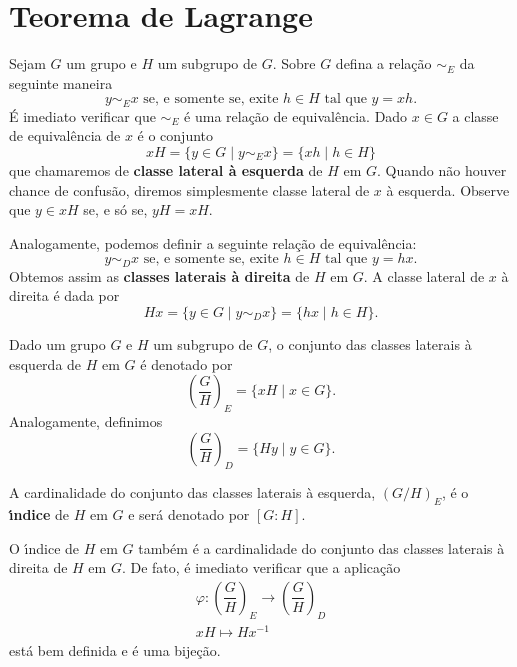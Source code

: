 
\section{Teorema de Lagrange} %
\label{sec:teorema_de_lagrange}

Sejam $G$ um grupo e $H$ um subgrupo de $G$. Sobre $G$ defina a rela\c{c}\~ao $\sim_{E}$ da seguinte maneira
\[
	y \sim_{E} x \mbox{ se, e somente se, exite } h \in H \mbox{ tal que } y = xh.
\]
\'E imediato verificar que $\sim_{E}$ \'e uma rela\c{c}\~ao de equival\^encia. Dado $x \in G$ a classe de equival\^encia de $x$ \'e o conjunto
\[
	xH = \{y \in G \mid y \sim_{E} x\} = \{xh \mid h \in H\}
\]
que chamaremos de \textbf{classe lateral \`a esquerda} de $H$ em $G$. Quando n\~ao houver chance de confus\~ao, diremos simplesmente classe lateral de $x$ \`a esquerda. Observe que $y \in xH$ se, e s\'o se, $yH = xH$.

Analogamente, podemos definir a seguinte rela\c{c}\~ao de equival\^encia:
\[
	y \sim_{D} x \mbox{ se, e somente se, exite } h \in H \mbox{ tal que } y = hx. 
\]
Obtemos assim as \textbf{classes laterais \`a direita} de $H$ em $G$. A classe lateral de $x$ \`a direita \'e dada por
\[
	Hx = \{y \in G \mid y \sim_{D} x\} = \{hx \mid h \in H\}.
\]

\begin{definicao}
	Dado um grupo $G$ e $H$ um subgrupo de $G$, o conjunto das classes laterais \`a esquerda de $H$ em $G$ \'e denotado por
	\[
		\left(\dfrac{G}{H}\right)_E = \{xH \mid x \in G\}.
	\]
	Analogamente, definimos
	\[
		\left(\dfrac{G}{H}\right)_D = \{Hy \mid y \in G\}.
	\]
\end{definicao}

\begin{definicao}
	A cardinalidade do conjunto das classes laterais \`a esquerda, $(G/H)_E$, \'e o \textbf{{\'\i}ndice} de $H$ em $G$ e ser\'a denotado por $[G:H]$.
\end{definicao}

\begin{observacao}
	O {\'\i}ndice de $H$ em $G$ tamb\'em \'e a cardinalidade do conjunto das classes laterais \`a direita de $H$ em $G$. De fato, \'e imediato verificar que a aplica\c{c}\~ao
	\begin{align*}
		\varphi : \left(\dfrac{G}{H}\right)_E \to \left(\dfrac{G}{H}\right)_D\\
		xH \mapsto Hx^{-1}
	\end{align*}
	est\'a bem definida e \'e uma bije\c{c}\~ao.
\end{observacao}

